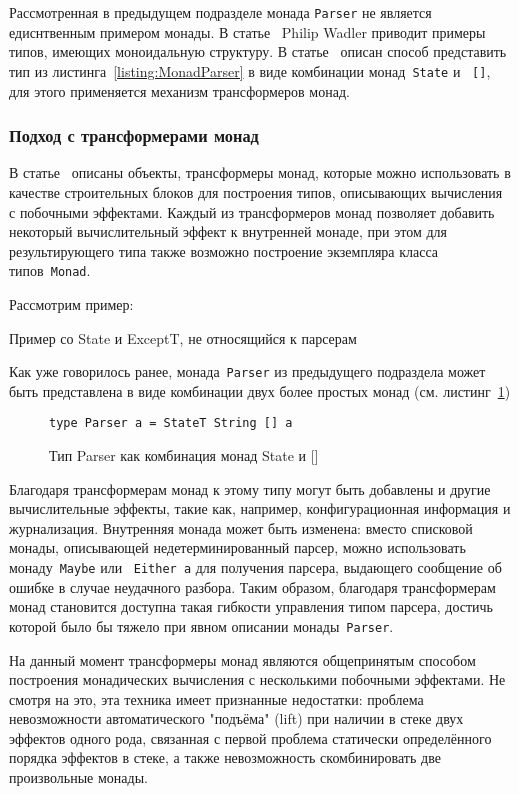 Рассмотренная в предыдущем подразделе монада \lstinline{Parser} не является едиснтвенным примером монады. В статье~\autocite{WadlerMonads} Philip Wadler приводит примеры типов, имеющих моноидальную структуру. В статье~\autocite{MonParsing} описан способ представить тип из листинга~\ref{listing:MonadParser} в виде комбинации монад~\lstinline{State} и ~\lstinline{[]}, для этого применяется механизм трансформеров монад. 

\subsubsection{Подход с трансформерами монад}

В статье~\autocite{MonadTransformers} описаны объекты, трансформеры монад, которые можно использовать в качестве строительных блоков для построения типов, описывающих вычисления с побочными эффектами. Каждый из трансформеров монад позволяет добавить некоторый вычислительный эффект к внутренней монаде, при этом для результирующего типа также возможно построение экземпляра класса типов~\lstinline{Monad}.

Рассмотрим пример: 

Пример со State и ExceptT, не относящийся к парсерам

Как уже говорилось ранее, монада~\lstinline{Parser} из предыдущего подраздела может быть представлена в виде комбинации двух более простых монад (см. листинг~\ref{listing:MonadTransParser})

\begin{figure}[h]
\begin{lstlisting}
type Parser a = StateT String [] a
\end{lstlisting}
\caption{Тип Parser как комбинация монад State и []}
\label{listing:MonadTransParser}
\end{figure}

Благодаря трансформерам монад к этому типу могут быть добавлены и другие вычислительные эффекты, такие как, например, конфигурационная информация и журнализация. Внутренняя монада может быть изменена: вместо списковой монады, описывающей недетерминированный парсер, можно использовать монаду~\lstinline{Maybe} или ~\lstinline{Either a} для получения парсера, выдающего сообщение об ошибке в случае неудачного разбора. Таким образом, благодаря трансформерам монад становится доступна такая гибкости управления типом парсера, достичь которой было бы тяжело при явном описании монады~\lstinline{Parser}.

На данный момент трансформеры монад являются общепринятым способом построения монадических вычисления с несколькими побочными эффектами. Не смотря на это, эта техника имеет признанные недостатки: проблема невозможности автоматического "подъёма" (lift) при наличии в стеке двух эффектов одного рода, связанная с первой проблема статически определённого порядка эффектов в стеке, а также невозможность скомбинировать две произвольные монады. 

